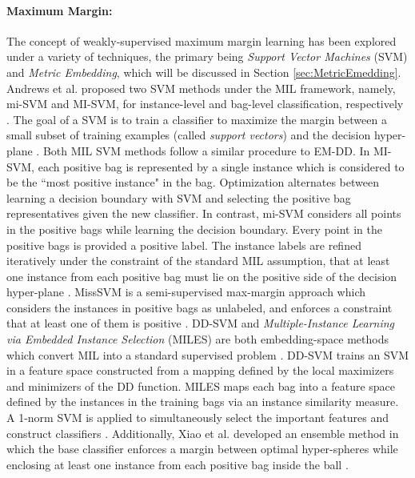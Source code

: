 \paragraph{Maximum Margin:}
The concept of weakly-supervised maximum margin learning has been explored under a variety of techniques, the primary being \textit{Support Vector Machines} (SVM) and \textit{Metric Embedding}, which will be discussed in Section \ref{sec:MetricEmedding}.  Andrews et al. proposed two SVM methods under the MIL framework, namely, mi-SVM and MI-SVM, for instance-level and bag-level classification,  respectively \citep{Andrews2011MISVM,Carbonneau2016MILSurvey,Du2017Thesis,Jiao2017Thesis}.  The goal of a SVM is to train a classifier to maximize the margin between a small subset of training examples (called \textit{support vectors}) and the decision hyper-plane \citep{Murphy2012}.  Both MIL SVM methods follow a similar procedure to EM-DD.  In MI-SVM, each positive bag is represented by a single instance which is considered to be the ``most positive instance" in the bag. Optimization alternates between learning a decision boundary with SVM and selecting the positive bag representatives given the new classifier. In contrast, mi-SVM considers all points in the positive bags while learning the decision boundary.  Every point in the positive bags is provided a positive label.  The instance labels are refined iteratively under the constraint of the standard MIL assumption, that at least one instance from each positive bag must lie on the positive side of the decision hyper-plane \citep{Cao2016VehicleDetectionMIL}.  MissSVM is a semi-supervised max-margin approach which considers the instances in positive bags as unlabeled, and enforces a constraint that at least one of them is positive \citep{Zhou2007MissSVM}.  DD-SVM  and \textit{Multiple-Instance Learning via Embedded Instance Selection} (MILES) are both embedding-space methods which convert MIL into a standard supervised problem \citep{Chen2006MILES}.  DD-SVM trains an SVM in a feature space constructed from a mapping defined by the local maximizers and minimizers of the DD function.  MILES maps each bag into a feature space defined by the instances in the training bags via an instance similarity measure. A 1-norm SVM is applied to simultaneously select the important features and construct classifiers \citep{RuizMunoz2015MILBirdsongClassification}. Additionally, Xiao et al. developed an ensemble method in which the base classifier enforces a margin between optimal hyper-spheres while enclosing at least one instance from each positive bag inside the ball \citep{Xiao2017SphereMIL}. 


